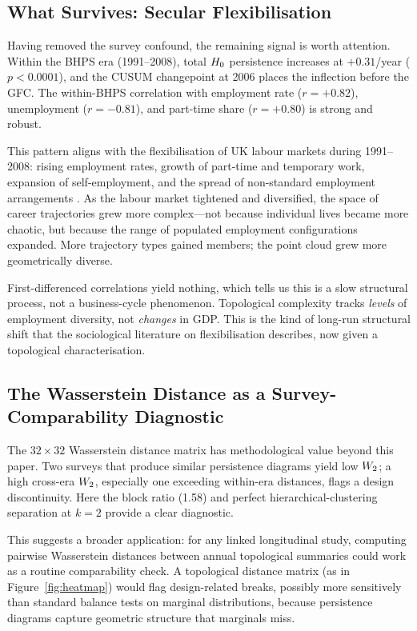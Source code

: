 \subsection{What Survives: Secular Flexibilisation}

Having removed the survey confound, the remaining signal is worth attention.
Within the BHPS era (1991--2008), total $H_{0}$ persistence increases at
$+0.31$/year ($p < 0.0001$), and the CUSUM changepoint at 2006 places the
inflection before the GFC.
The within-BHPS correlation with employment rate ($r = +0.82$), unemployment
($r = -0.81$), and part-time share ($r = +0.80$) is strong and robust.

This pattern aligns with the flexibilisation of UK labour markets during
1991--2008: rising employment rates, growth of part-time and temporary work,
expansion of self-employment, and the spread of non-standard employment
arrangements \citep{rubery2016labour, grimshaw2017reducing}.
As the labour market tightened and diversified, the space of career trajectories
grew more complex---not because individual lives became more chaotic, but because
the range of populated employment configurations expanded.
More trajectory types gained members; the point cloud grew more geometrically
diverse.

First-differenced correlations yield nothing, which tells us this is a slow
structural process, not a business-cycle phenomenon.
Topological complexity tracks \emph{levels} of employment diversity, not
\emph{changes} in GDP.
This is the kind of long-run structural shift that the sociological literature on
flexibilisation describes, now given a topological characterisation.

\subsection{The Wasserstein Distance as a Survey-Comparability Diagnostic}

The $32 \times 32$ Wasserstein distance matrix has methodological value beyond
this paper.
Two surveys that produce similar persistence diagrams yield low $W_2$; a high
cross-era $W_2$, especially one exceeding within-era distances, flags a design
discontinuity.
Here the block ratio (1.58) and perfect hierarchical-clustering separation at
$k = 2$ provide a clear diagnostic.

This suggests a broader application: for any linked longitudinal study, computing
pairwise Wasserstein distances between annual topological summaries could work as
a routine comparability check.
A topological distance matrix (as in Figure~\ref{fig:heatmap}) would flag
design-related breaks, possibly more sensitively than standard balance tests on
marginal distributions, because persistence diagrams capture geometric structure
that marginals miss.


